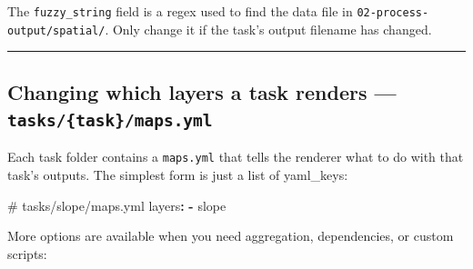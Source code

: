 \documentclass[
  letterpaper,
  DIV=11,
  numbers=noendperiod]{scrreprt}
\newenvironment{Shaded}{\begin{snugshade}}{\end{snugshade}}
\newcommand{\AttributeTok}[1]{\textcolor[rgb]{0.40,0.45,0.13}{#1}}
\newcommand{\CommentTok}[1]{\textcolor[rgb]{0.37,0.37,0.37}{#1}}
\newcommand{\FunctionTok}[1]{\textcolor[rgb]{0.28,0.35,0.67}{#1}}
\newcommand{\KeywordTok}[1]{\textcolor[rgb]{0.00,0.23,0.31}{\textbf{#1}}}
\begin{document}
\begin{tcolorbox}[enhanced jigsaw, arc=.35mm, bottomrule=.15mm, bottomtitle=1mm, breakable, colback=white, colbacktitle=quarto-callout-note-color!10!white, colframe=quarto-callout-note-color-frame, coltitle=black, left=2mm, leftrule=.75mm, opacityback=0, opacitybacktitle=0.6, rightrule=.15mm, title=\textcolor{quarto-callout-note-color}{\faInfo}\hspace{0.5em}{Note}, titlerule=0mm, toprule=.15mm, toptitle=1mm]

The \texttt{fuzzy\_string} field is a regex used to find the data file
in \texttt{02-process-output/spatial/}. Only change it if the task's
output filename has changed.

\end{tcolorbox}

\begin{center}\rule{0.5\linewidth}{0.5pt}\end{center}

\subsection{\texorpdfstring{Changing which layers a task renders ---
\texttt{tasks/\{task\}/maps.yml}}{Changing which layers a task renders --- tasks/\{task\}/maps.yml}}\label{changing-which-layers-a-task-renders-taskstaskmaps.yml}

Each task folder contains a \texttt{maps.yml} that tells the renderer
what to do with that task's outputs. The simplest form is just a list of
yaml\_keys:

\begin{Shaded}
\begin{Highlighting}[]
\CommentTok{\# tasks/slope/maps.yml}
\FunctionTok{layers}\KeywordTok{:}
\AttributeTok{  }\KeywordTok{{-}}\AttributeTok{ slope}
\end{Highlighting}
\end{Shaded}

More options are available when you need aggregation, dependencies, or
custom scripts:
\end{document}
